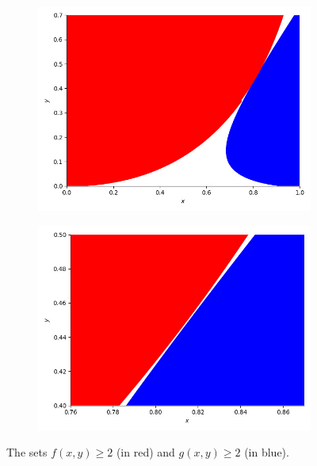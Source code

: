 \documentclass[12pt,reqno]{amsart}
\theoremstyle{definition}
\theoremstyle{remark}
\renewcommand{\ge}{\geqslant}
\begin{document}
\begin{figure}[h]
  \centering
  \vskip-0.5cm
  \begin{subfigure}[b]{0.47\textwidth}
    \includegraphics[width=\textwidth]{Figure_diagonal.jpeg}
  \end{subfigure}
  \hspace{0.5cm}
  \begin{subfigure}[b]{0.47\textwidth}
    \includegraphics[width=\textwidth]{Figure_diagonal_zoomed.jpeg}
  \end{subfigure}
  \vskip-0.2cm
  \caption{The sets $f(x,y) \ge 2$ (in red) and $g(x,y) \ge 2$ (in blue).}
  \label{fig:diagonal}
\end{figure}
\end{document}
